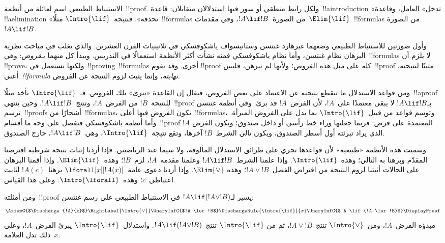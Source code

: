 \documentclass[../../../include/open-logic-section]{subfiles}
\begin{document}


الاستنباط الطبيعي اسم لعائلة من أنظمة~!!{proof}. ولكل رابط منطقي أو سور
فيها استدلالان متقابلان: قاعدة~!!a{introduction} «تدخل» العامل، وقاعدة
!!a{elimination} «تحذفه». فنتيجة~$\Intro{\lif}$ مثلًا~!!{formula}s من
الصورة~$!A \lif !B$، وفي مقدمات~$\Elim{\lif}$~!!{formula}s من الصورة
$!A \lif !B$.

وأول صورتين للاستنباط الطبيعي وضعهما غيرهارد غنتسن وستانيسواف
ياشكوفسكي في ثلاثينيات القرن العشرين. والذي يغلب في مباحث نظرية البرهان
نظام غنتسن، وأما نظام ياشكوفسكي فمنه نشأت أكثر الأنظمة استعمالًا في
التدريس. ويبدأ كل منهما بـ\emph{فروض}: وهي~!!{formula}s لا يلزم أن
!!{prove}، ولكنها تستعمل في~!!{proving}~!!{formula}s أخرى. وقد يقوم
!!{proof} كله على مثل هذه الفروض؛ ولأنها لم تبرهن، فليس~!!{proof} مثبتًا
لنتيجته، أعني~\emph{!!{formula} نهايته}، وإنما يثبت لزوم النتيجة عن
الفروض.

ومن قواعد الاستدلال ما تنقطع نتيجته عن الاعتماد على بعض الفروض، فيقال
إن القاعدة «تبرئ» تلك الفروض. فـ~$\Intro{\lif}$ تأخذ مثلًا~!!a{proof}
للنتيجة~$!B$ من الفرض~$!A$، وتنتج~$!A \lif !B$. وحين ينتهي~!!{proof}
بـ$!A \lif !B$ لا يبقى معتمدًا على~$!A$، لأن الفرض~$!A$ قد برئ. وفي
أنظمة غنتسن ترسم~!!{proof}s أشجارًا من~!!{formula}s، تكون الفروض فيها
أعلى~!!{formula}s، وتوسم قواعد من قبيل~$\Intro{\lif}$ بما يدل على
الفروض المبرأة. وأما أنظمة ياشكوفسكي فتفصل على وجه ما أقسام~!!{proof}
المعتمدة على فرض: فربما جعلتها وراء خط رأسي أو داخل صندوق؛ ويكون الفرض
$!A$ الذي يراد تبرئته أول أسطر الصندوق، ويكون تالي الشرط~$!B$ آخرها،
وتقع نتيجة~$\Intro{\lif}$، وهي~$!A \lif !B$، خارج الصندوق.

وسميت هذه الأنظمة «طبيعية» لأن قواعدها تجري على طرائق الاستدلال المألوفة،
ولا سيما عند الرياضيين. فإذا أردنا إثبات نتيجة شرطية افترضنا المقدّم
وبرهنا به التالي؛ وهذه~$\Intro{\lif}$. وإذا علمنا الشرط~$!A \lif !B$
وعلمنا مقدمه~$!A$، لزم~$!B$؛ وهذه~$\Elim{\lif}$. وإذا أقمنا البرهان
على الحالات أثبتنا لزوم النتيجة من افتراض الفصل~$!A \lor !B$؛ وهذه
$\Elim{\lor}$. وإذا أردنا دعوى عامة~$\lforall[x][!A(x)]$ برهنا~$!A(c)$
لثابت اعتباطي~$c$؛ وهذه~$\Intro{\lforall}$. وعلى هذا القياس.

ومن أمثلته~!!{proof} يسير لـ$!A \lif (!A \lor !B)$ في الاستنباط
الطبيعي على رسم غنتسن:
\[
\AxiomC{$\Discharge{!A}{x}$}
\RightLabel{\Intro{\lor}}
\UnaryInfC{$!A \lor !B$}
\DischargeRule{\Intro{\lif}}{x}
\UnaryInfC{$!A \lif (!A \lor !B)$}
\DisplayProof
\]
مبدؤه الفرض~$!A$، ومن~$\Intro{\lor}$ تنتج~$!A \lor !B$، ثم من
$\Intro{\lif}$ تنتج~$!A \lif (!A \lor !B)$. واستدلال~$\Intro{\lif}$
يبرئ الفرض~$!A$، وعلى ذلك تدل العلامة~$x$.
\end{document}
